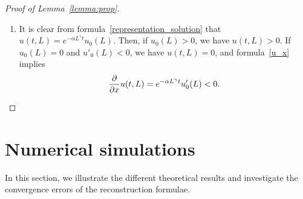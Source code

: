 \documentclass[10pt]{amsart}
\theoremstyle{definition}\newtheorem{defi}[theo]{Definition}\newtheorem{rema}[theo]{Remark}\newtheorem{exam}[theo]{Example}\newtheorem{exem}[theo]{Example}\newtheorem{nota}[theo]{Notation}
\newcommand*\eps{\varepsilon}
\newcommand*\p{\partial}
\renewcommand*\a{\alpha}
\newcommand*\supp{{\mbox{\small\rm supp}}\,}
\begin{document}
\begin{proof}[Proof of Lemma~\ref{lemma:prop}]
\begin{enumerate}
\begin{equation*}
Y'(t) \geq -\a y^{\gamma} Y(t),
\end{equation*}
i.e.
\begin{equation*}
u(t,y)= Y(t) \geq e^{-\a y^{\gamma}t} Y(0)=e^{-\a y^{\gamma}t} u_0(y).
\end{equation*}
If $u_0(y)\neq 0$, then for all $t\geq 0$, $u(t,y)\neq 0$. If $u_0(y)= 0$, since $y\in \supp(u_0)$, for all $\eps>0$, there exists $y_{\eps}$ such that $|y-y_{\eps}|<\eps$ and $u_0(y_{\eps})\neq 0$ and then $u(t,y_{\eps})\neq 0$, which implies that $y\in \supp(u(t,.))$. Thus $\supp(u(t,.))=[0,L]$.
\item It is clear from formula~\eqref{representation_solution} that $u(t,L)= e^{-\a L^{\gamma}t} u_0(L)$. Then, if $u_0(L)>0$, we have $u(t,L)>0$. If $u_0(L)=0$ and $u'_0(L)<0$, we have $u(t,L)= 0$, and formula~\eqref{u_x} implies
\begin{equation*}
\dfrac{\p}{\p x}u(t,L)= e^{-\a L^{\gamma}t}u'_0(L) <0.\qedhere
\end{equation*}
\end{enumerate}
\end{proof}




\section{Numerical simulations}

In this section, we illustrate the different theoretical results and investigate the convergence errors of the reconstruction formulae.
\end{document}
